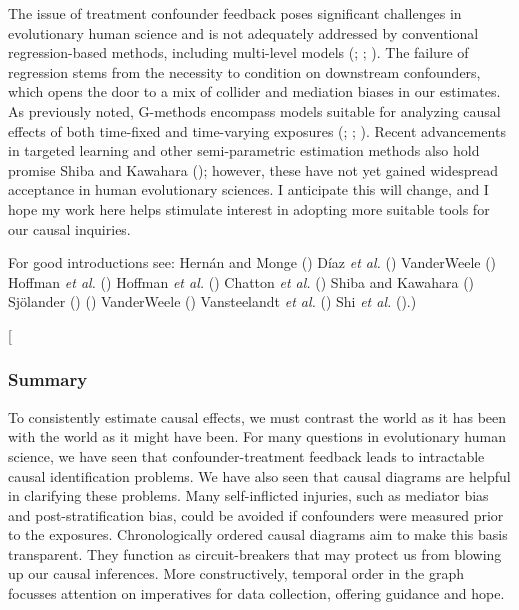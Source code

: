 \documentclass[
  singlecolumn,
  9pt]{article}
\begin{document}
The issue of treatment confounder feedback poses significant challenges
in evolutionary human science and is not adequately addressed by
conventional regression-based methods, including multi-level models
(;
; ). The failure of regression stems from the necessity
to condition on downstream confounders, which opens the door to a mix of
collider and mediation biases in our estimates. As previously noted,
G-methods encompass models suitable for analyzing causal effects of both
time-fixed and time-varying exposures
(;
;
). Recent advancements
in targeted learning and other semi-parametric estimation methods also
hold promise Shiba and Kawahara ();
however, these have not yet gained widespread acceptance in human
evolutionary sciences. I anticipate this will change, and I hope my work
here helps stimulate interest in adopting more suitable tools for our
causal inquiries.

For good introductions see: Hernán and Monge
() Díaz \emph{et al.}
() VanderWeele
() Hoffman \emph{et al.}
() Hoffman \emph{et al.}
() Chatton \emph{et al.}
() Shiba and Kawahara
() Sjölander
()
() VanderWeele
() Vansteelandt \emph{et al.}
() Shi \emph{et al.}
().)

{[}

\subsubsection{Summary}\label{summary}

To consistently estimate causal effects, we must contrast the world as
it has been with the world as it might have been. For many questions in
evolutionary human science, we have seen that confounder-treatment
feedback leads to intractable causal identification problems. We have
also seen that causal diagrams are helpful in clarifying these problems.
Many self-inflicted injuries, such as mediator bias and
post-stratification bias, could be avoided if confounders were measured
prior to the exposures. Chronologically ordered causal diagrams aim to
make this basis transparent. They function as circuit-breakers that may
protect us from blowing up our causal inferences. More constructively,
temporal order in the graph focusses attention on imperatives for data
collection, offering guidance and hope.
\end{document}
